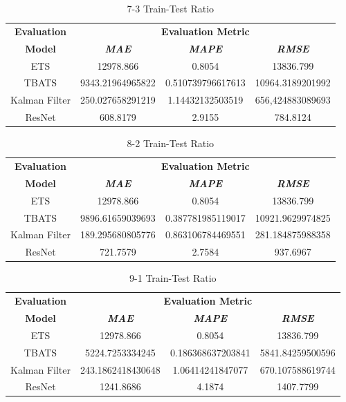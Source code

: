 \documentclass[conference]{IEEEtran}
\begin{document}
\begin{table}[htbp]
\caption{7-3 Train-Test Ratio}
\begin{center}
\begin{tabular}{|c|c|c|c|}
\hline
\textbf{Evaluation}&\multicolumn{3}{|c|}{\textbf{Evaluation Metric}} \\
\cline{2-4} 
\textbf{Model} & \textbf{\textit{MAE}}& \textbf{\textit{MAPE}}& \textbf{\textit{RMSE}} \\
\hline
ETS & 12978.866 & 0.8054 & 13836.799\\
\hline
TBATS & 9343.21964965822 & 0.510739796617613 & 10964.3189201992\\
\hline
Kalman Filter & 250.027658291219 & 1.14432132503519 & 656,424883089693\\
\hline
ResNet & 608.8179 & 2.9155 & 784.8124\\
\hline
\end{tabular}
\label{tab1}
\end{center}
\end{table}

\begin{table}[htbp]
\caption{8-2 Train-Test Ratio}
\begin{center}
\begin{tabular}{|c|c|c|c|}
\hline
\textbf{Evaluation}&\multicolumn{3}{|c|}{\textbf{Evaluation Metric}} \\
\cline{2-4} 
\textbf{Model} & \textbf{\textit{MAE}}& \textbf{\textit{MAPE}}& \textbf{\textit{RMSE}} \\
\hline
ETS & 12978.866 & 0.8054 & 13836.799\\
\hline
TBATS & 9896.61659039693 & 0.387781985119017 & 10921.9629974825\\
\hline
Kalman Filter & 189.295680805776 & 0.863106784469551 & 281.184875988358\\
\hline
ResNet & 721.7579 & 2.7584 & 937.6967\\
\hline
\end{tabular}
\label{tab1}
\end{center}
\end{table}

\begin{table}[htbp]
\caption{9-1 Train-Test Ratio}
\begin{center}
\begin{tabular}{|c|c|c|c|}
\hline
\textbf{Evaluation}&\multicolumn{3}{|c|}{\textbf{Evaluation Metric}} \\
\cline{2-4} 
\textbf{Model} & \textbf{\textit{MAE}}& \textbf{\textit{MAPE}}& \textbf{\textit{RMSE}} \\
\hline
ETS & 12978.866 & 0.8054 & 13836.799\\
\hline
TBATS & 5224.7253334245 & 0.186368637203841 & 5841.84259500596\\
\hline
Kalman Filter & 243.1862418430648 & 1.06414241847077 & 670.107588619744\\
\hline
ResNet & 1241.8686 & 4.1874 & 1407.7799\\
\hline
\end{tabular}
\label{tab1}
\end{center}
\end{table}
\end{document}
